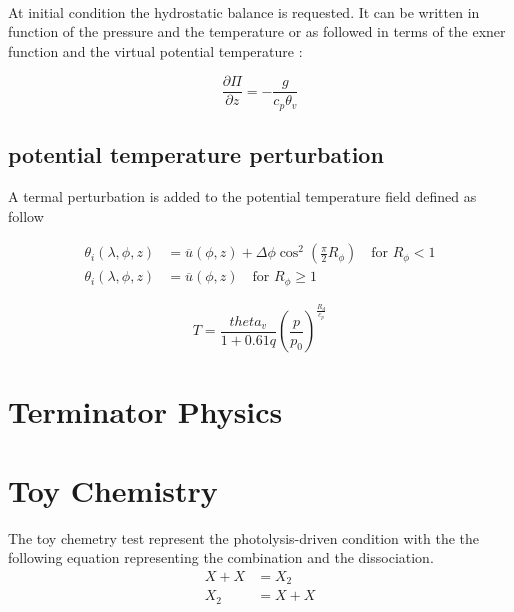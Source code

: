 \documentclass[times,doublespace]{fldauth}
\begin{document}
~\\ At initial condition the hydrostatic balance is requested. It can be written in function of the pressure and the temperature or as followed in terms of the exner function and the virtual potential temperature :

  \begin{equation}
 \frac{\partial{\Pi}}{\partial z} = - \frac{g}{c_p\theta_v}
 \end {equation}



\subsection{potential temperature perturbation}

A termal perturbation is added to the potential temperature field defined as follow

\begin{equation}
\begin{split}
\theta_i(\lambda,\phi,z)&=\overline{u}(\phi,z) + \Delta\phi\cos^2\left(\frac{\pi}{2}R_{\phi}\right) \text{ ~~for   } R_{\phi} < 1 \\
\theta_i(\lambda,\phi,z)&=\overline{u}(\phi,z) \text{ ~~for   } R_{\phi} \geq 1
\end{split}
\end{equation}


 \begin{equation}
T=\frac{theta_v}{1+0.61q}\left(\frac{p}{p_0}\right)^{\frac{R_d}{c_p}}
\end{equation}

\clearpage
\section{Terminator Physics}




\section{Toy Chemistry}

The toy chemetry test represent the photolysis-driven condition with the the following equation representing the combination and the dissociation.
\begin{equation}
\begin{split}
X+X&=X_2 \\
X_2&=X+X \\
\end{split}
\end{equation}
\end{document}
